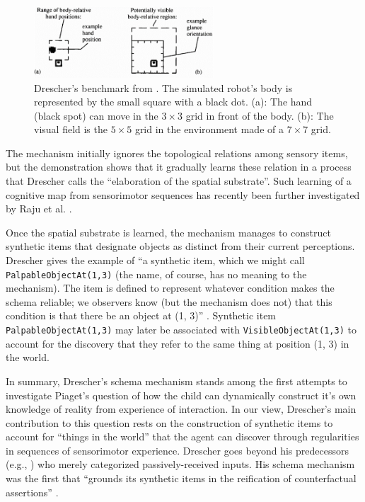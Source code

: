 \documentclass[runningheads]{llncs}
\begin{document}
\begin{figure}
	\centering
	\includegraphics[width=0.6\textwidth]{Figure_drescher_expe.png}
	\caption{Drescher's benchmark from \cite[Fig. 6.1]{drescher_made-up_1991}. The simulated robot's body is represented by the small square with a black dot. 
		(a): The hand (black spot) can move in the $3 \times 3$ grid in front of the body.
		(b): The visual field is the $5 \times 5$ grid in the environment made of a $7 \times 7$ grid.} 
	\label{fig:drescher2}
\end{figure}

The mechanism initially ignores the topological relations among sensory items, but the demonstration shows that it gradually learns these relation in a process that Drescher calls the ``elaboration of the spatial substrate''. 
Such learning of a cognitive map from sensorimotor sequences has recently been further investigated by Raju et al. \cite{raju_space_2022}.

Once the spatial substrate is learned, the mechanism manages to construct synthetic items that designate objects as distinct from their current perceptions.
Drescher gives the example of ``a synthetic item, which we might call \texttt{PalpableObjectAt(1,3)} (the name, of course, has no meaning to the mechanism). 
The item is defined to represent whatever condition makes the schema reliable; we observers know (but the mechanism does not) that this condition is that there be an object at (1, 3)'' \cite[p. 13]{drescher_made-up_1991}.
Synthetic item \texttt{PalpableObjectAt(1,3)} may later be associated with \texttt{VisibleObjectAt(1,3)} to account for the discovery that they refer to the same thing at position (1, 3) in the world.

In summary, Drescher's schema mechanism stands among the first attempts to investigate Piaget's question of how the child can dynamically construct it's own knowledge of reality from experience of interaction.  
In our view, Drescher's main contribution to this question rests on the construction of synthetic items to account for ``things in the world'' that the agent can discover through regularities in sequences of sensorimotor experience. 
Drescher goes beyond his predecessors (e.g., \cite{harnad_symbol_1990}) who merely categorized passively-received inputs.
His schema mechanism was the first that ``grounds its synthetic items in the reification of counterfactual assertions'' \cite[p. 90]{drescher_made-up_1991}. 
\end{document}
